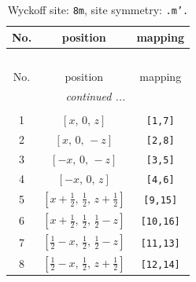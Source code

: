 \documentclass[fleqn,8pt]{jsarticle}
\begin{document}
\begin{longtable}{ccc}
\caption{Wyckoff site: {\tt 8m}, site symmetry: {\tt .m'.}}
 \\
 \hline \hline
No. & position & mapping \\ \hline \endfirsthead

\multicolumn{2}{l}{\tablename\ \thetable{}} \\
 \hline \hline
No. & position & mapping \\ \hline \endhead

 \hline \hline
\multicolumn{2}{r}{\footnotesize\it continued ...} \\ \endfoot

 \hline \hline
\multicolumn{2}{r}{} \\ \endlastfoot

1 & $\left[ x,\, 0,\, z \right]$ & {\tt [1,7]} \\ \hline
2 & $\left[ x,\, 0,\, - z \right]$ & {\tt [2,8]} \\ \hline
3 & $\left[ - x,\, 0,\, - z \right]$ & {\tt [3,5]} \\ \hline
4 & $\left[ - x,\, 0,\, z \right]$ & {\tt [4,6]} \\ \hline
5 & $\left[ x + \frac{1}{2},\, \frac{1}{2},\, z + \frac{1}{2} \right]$ & {\tt [9,15]} \\ \hline
6 & $\left[ x + \frac{1}{2},\, \frac{1}{2},\, \frac{1}{2} - z \right]$ & {\tt [10,16]} \\ \hline
7 & $\left[ \frac{1}{2} - x,\, \frac{1}{2},\, \frac{1}{2} - z \right]$ & {\tt [11,13]} \\ \hline
8 & $\left[ \frac{1}{2} - x,\, \frac{1}{2},\, z + \frac{1}{2} \right]$ & {\tt [12,14]} \\
\end{longtable}
\renewcommand{\arraystretch}{1.2}
\end{document}
